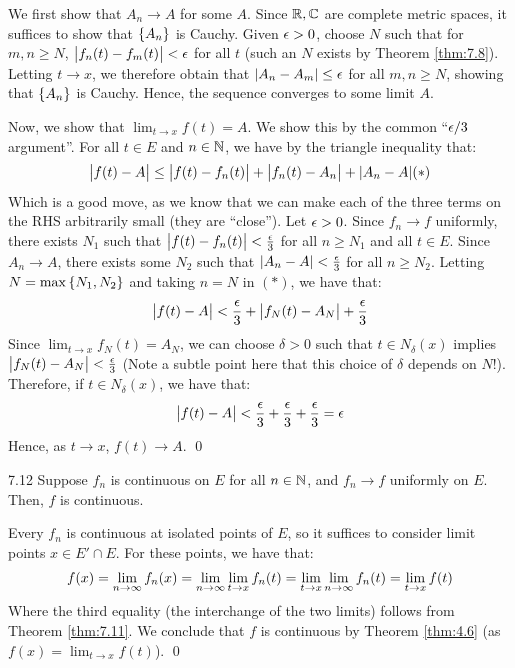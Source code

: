 \begin{nproof}
    We first show that $A_n \rightarrow A$ for some $A$. Since $\mathbb{R}, \mathbb{C}$ are complete metric spaces, it suffices to show that $\set{A_n}$ is Cauchy. Given $\epsilon > 0$, choose $N$ such that for $m, n \geq N$, $\abs{f_n(t) - f_m(t)} < \epsilon$ for all $t$ (such an $N$ exists by Theorem \ref{thm:7.8}). Letting $t \rightarrow x$, we therefore obtain that $\abs{A_n - A_m} \leq \epsilon$ for all $m, n \geq N$, showing that $\set{A_n}$ is Cauchy. Hence, the sequence converges to some limit $A$. 

    Now, we show that $\lim_{t \rightarrow x}f(t) = A$. We show this by the common ``$\epsilon/3$ argument''. For all $t \in E$ and $n \in \mathbb{N}$, we have by the triangle inequality that:
    \begin{align*}
        \abs{f(t) - A} \leq \abs{f(t) - f_n(t)} + \abs{f_n(t) - A_n} + \abs{A_n - A} (*)
    \end{align*} 
    Which is a good move, as we know that we can make each of the three terms on the RHS arbitrarily small (they are ``close''). Let $\epsilon > 0$. Since $f_n \rightarrow f$ uniformly, there exists $N_1$ such that $\abs{f(t) - f_n(t)} < \frac{\epsilon}{3}$ for all $n \geq N_1$ and all $t \in E$. Since $A_n \rightarrow A$, there exists some $N_2$ such that $\abs{A_n - A} < \frac{\epsilon}{3}$ for all $n \geq N_2$. Letting $N = \max\set{N_1, N_2}$ and taking $n = N$ in $(*)$, we have that:
    \begin{align*}
        \abs{f(t) - A} < \frac{\epsilon}{3} + \abs{f_N(t) - A_N} + \frac{\epsilon}{3} 
    \end{align*}
    Since $\lim_{t \rightarrow x} f_N(t) = A_N$, we can choose $\delta > 0$ such that $t \in N_{\delta}(x)$ implies $\abs{f_N(t) - A_N} < \frac{\epsilon}{3}$ (Note a subtle point here that this choice of $\delta$ depends on $N$!). Therefore, if $t \in N_{\delta}(x)$, we have that:
    \begin{align*}
        \abs{f(t) - A} < \frac{\epsilon}{3} + \frac{\epsilon}{3} + \frac{\epsilon}{3} = \epsilon
    \end{align*}
    Hence, as $t \rightarrow x$, $f(t) \rightarrow A$. \qed
\end{nproof}

\begin{theorem}{}{7.12}
    Suppose $f_n$ is continuous on $E$ for all $n \in \mathbb{N}$, and $f_n \rightarrow f$ uniformly on $E$. Then, $f$ is continuous.
\end{theorem}
\begin{nproof}
    Every $f_n$ is continuous at isolated points of $E$, so it suffices to consider limit points $x \in E' \cap E$. For these points, we have that:
    \begin{align*}
        f(x) = \lim_{n \rightarrow \infty}f_n(x) = \lim_{n \rightarrow \infty}\lim_{t \rightarrow x} f_n(t) = \lim_{t \rightarrow x} \lim_{n \rightarrow \infty} f_n(t) = \lim_{t \rightarrow x} f(t)
    \end{align*}
    Where the third equality (the interchange of the two limits) follows from Theorem \ref{thm:7.11}. We conclude that $f$ is continuous by Theorem \ref{thm:4.6} (as $f(x) = \lim_{t \rightarrow x} f(t)$). \qed
\end{nproof}

